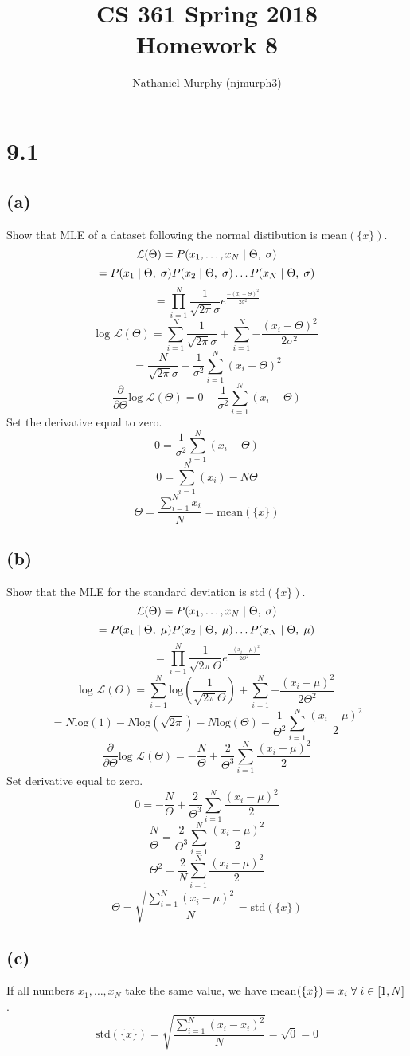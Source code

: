 \documentclass[11pt]{article}
\title{\textbf{CS 361 Spring 2018\\Homework 8}}
\author{Nathaniel Murphy (njmurph3)}
\date{}
\newcommand{\given}{\hspace{1mm}|\hspace{1mm}}
\newcommand{\hsp}{\hspace{1mm}}
\begin{document}
\maketitle
\section*{9.1}
\subsection*{(a)}
Show that MLE of a dataset following the normal distibution is mean$(\{x\})$.
\[\mathcal{L}(\Theta)=P(x_1,\ldots,x_N\given\Theta,\hsp\sigma)\]
\[=P(x_1\given\Theta,\hsp\sigma)P(x_2\given\Theta,\hsp\sigma)\ldots P(x_N\given\Theta,\hsp\sigma)\]
\[=\prod_{i=1}^N\frac{1}{\sqrt{2\pi}\sigma}e^{\frac{-(x_i-\Theta)^2}{2\sigma^2}}\]
\[\text{log }\mathcal{L}(\Theta)=\sum_{i=1}^N{\frac{1}{\sqrt{2\pi}\sigma}}+\sum_{i=1}^N{-\frac{(x_i-\Theta)^2}{2\sigma^2}}\]
\[=\frac{N}{\sqrt{2\pi}\sigma}-\frac{1}{\sigma^2}\sum_{i=1}^N{(x_i-\Theta)^2}\]
\[\frac{\partial}{\partial\Theta}\text{log }\mathcal{L}(\Theta)=0-\frac{1}{\sigma^2}\sum_{i=1}^N{(x_i-\Theta)}\]
Set the derivative equal to zero.
\[0=\frac{1}{\sigma^2}\sum_{i=1}^N{(x_i-\Theta)}\]
\[0=\sum_{i=1}^N{(x_i)}-N\Theta\]
\[\Theta = \frac{\sum_{i=1}^N{x_i}}{N}=\text{mean}(\{x\})\]
\subsection*{(b)}
Show that the MLE for the standard deviation is std$(\{x\})$.
\[\mathcal{L}(\Theta)=P(x_1,\ldots,x_N\given\Theta,\hsp\sigma)\]
\[=P(x_1\given\Theta,\hsp\mu)P(x_2\given\Theta,\hsp\mu)\ldots P(x_N\given\Theta,\hsp\mu)\]
\[=\prod_{i=1}^N\frac{1}{\sqrt{2\pi}\Theta}e^{\frac{-(x_i-\mu)^2}{2\Theta^2}}\]
\[\text{log }\mathcal{L}(\Theta)=\sum_{i=1}^N {\text{log}\left(\frac{1}{\sqrt{2\pi}\Theta}\right)}+\sum_{i=1}^N{-\frac{(x_i-\mu)^2}{2\Theta^2}}\]
\[=N\text{log}(1)-N\text{log}(\sqrt{2\pi})-N\text{log}(\Theta)-\frac{1}{\Theta^2}\sum_{i=1}^N\frac{(x_i-\mu)^2}{2}\]
\[\frac{\partial}{\partial\Theta}\text{log }\mathcal{L}(\Theta)=-\frac{N}{\Theta}+\frac{2}{\Theta^3}\sum_{i=1}^N{\frac{(x_i-\mu)^2}{2}}\]
Set derivative equal to zero.
\[0=-\frac{N}{\Theta}+\frac{2}{\Theta^3}\sum_{i=1}^N{\frac{(x_i-\mu)^2}{2}}\]
\[\frac{N}{\Theta}=\frac{2}{\Theta^3}\sum_{i=1}^N{\frac{(x_i-\mu)^2}{2}}\]
\[\Theta^2=\frac{2}{N}\sum_{i=1}^N{\frac{(x_i-\mu)^2}{2}}\]
\[\Theta=\sqrt{\frac{\sum_{i=1}^N{(x_i-\mu)^2}}{N}}=\text{std}(\{x\})\]
\subsection*{(c)}
If all numbers $x_1,\ldots,x_N$ take the same value, we have mean$(\{x\})=x_i\hsp\forall\hsp i\in[1,N]$.
\[\text{std}(\{x\})=\sqrt{\frac{\sum_{i=1}^N{(x_i-x_i)^2}}{N}}=\sqrt{0}=0\]
\end{document}
